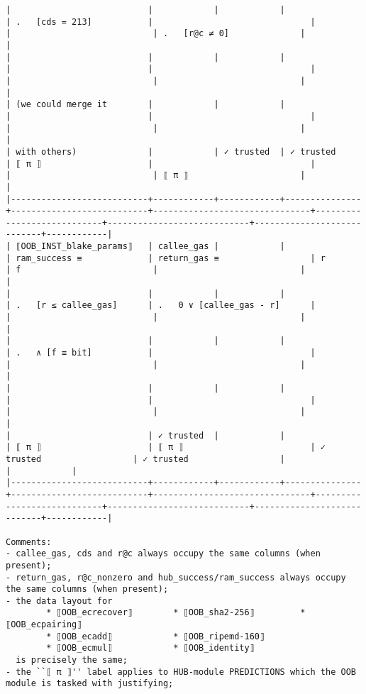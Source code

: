 \documentclass[varwidth=\maxdimen,margin=0.5cm,multi={verbatim}]{standalone}
\begin{document}
\begin{verbatim}
|                           |            |            |               | .   [cds = 213]           |                               |                            |                            | .   [r@c ≠ 0]              |            |
|                           |            |            |               |                           |                               |                            |                            |                            |            |
| (we could merge it        |            |            |               |                           |                               |                            |                            |                            |            |
| with others)              |            | ✓ trusted  | ✓ trusted     | ⟦ π ⟧                     |                               |                            |                            | ⟦ π ⟧                      |            |
|---------------------------+------------+------------+---------------+---------------------------+-------------------------------+----------------------------+----------------------------+----------------------------+------------|
| ⟦OOB_INST_blake_params⟧   | callee_gas |            |               | ram_success ≡             | return_gas ≡                  | r                          | f                          |                            |            |
|                           |            |            |               | .   [r ≤ callee_gas]      | .   0 ∨ [callee_gas - r]      |                            |                            |                            |            |
|                           |            |            |               | .   ∧ [f ≡ bit]           |                               |                            |                            |                            |            |
|                           |            |            |               |                           |                               |                            |                            |                            |            |
|                           | ✓ trusted  |            |               | ⟦ π ⟧                     | ⟦ π ⟧                         | ✓ trusted                  | ✓ trusted                  |                            |            |
|---------------------------+------------+------------+---------------+---------------------------+-------------------------------+----------------------------+----------------------------+----------------------------+------------|

Comments: 
- callee_gas, cds and r@c always occupy the same columns (when present);
- return_gas, r@c_nonzero and hub_success/ram_success always occupy the same columns (when present);
- the data layout for
        * ⟦OOB_ecrecover⟧        * ⟦OOB_sha2-256⟧         * ⟦OOB_ecpairing⟧
        * ⟦OOB_ecadd⟧            * ⟦OOB_ripemd-160⟧                  
        * ⟦OOB_ecmul⟧            * ⟦OOB_identity⟧
  is precisely the same;
- the ``⟦ π ⟧'' label applies to HUB-module PREDICTIONS which the OOB module is tasked with justifying;


\end{verbatim}
\end{document}
